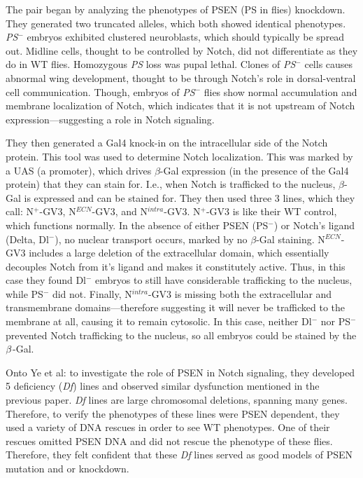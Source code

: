 The pair began by analyzing the phenotypes of PSEN (PS in flies) knockdown. They generated two truncated alleles, which both showed identical phenotypes. \textit{PS}$^-$ embryos exhibited clustered neuroblasts, which should typically be spread out. Midline cells, thought to be controlled by Notch, did not differentiate as they do in WT flies. Homozygous \textit{PS} loss was pupal lethal. Clones of \textit{PS}$^-$ cells causes abnormal wing development, thought to be through Notch's role in dorsal-ventral cell communication. Though, embryos of \textit{PS}$^-$ flies show normal accumulation and membrane localization of Notch, which indicates that it is not upstream of Notch expression---suggesting a role in Notch signaling.\newline

They then generated a Gal4 knock-in on the intracellular side of the Notch protein. This tool was used to determine Notch localization. This was marked by a UAS (a promoter), which drives $\beta$-Gal expression (in the presence of the Gal4 protein) that they can stain for. I.e., when Notch is trafficked to the nucleus, $\beta$-Gal is expressed and can be stained for. They then used three 3 lines, which they call: N$^+$-GV3, N$^{ECN}$-GV3, and N$^{intra}$-GV3. N$^+$-GV3 is like their WT control, which functions normally. In the absence of either PSEN (PS$^-$) or Notch's ligand (Delta, Dl$^-$), no nuclear transport occurs, marked by no $\beta$-Gal staining. N$^{ECN}$-GV3 includes a large deletion of the extracellular domain, which essentially decouples Notch from it's ligand and makes it constitutely active. Thus, in this case they found Dl$^-$ embryos to still have considerable trafficking to the nucleus, while PS$^-$ did not. Finally, N$^{intra}$-GV3 is missing both the extracellular and transmembrane domains---therefore suggesting it will never be trafficked to the membrane at all, causing it to remain cytosolic. In this case, neither Dl$^-$ nor PS$^-$ prevented Notch trafficking to the nucleus, so all embryos could be stained by the $\beta$-Gal.\newline

Onto Ye et al: to investigate the role of PSEN in Notch signaling, they developed 5 deficiency (\textit{Df}) lines and observed similar dysfunction mentioned in the previous paper. \textit{Df} lines are large chromosomal deletions, spanning many genes. Therefore, to verify the phenotypes of these lines were PSEN dependent, they used a variety of DNA rescues in order to see WT phenotypes. One of their rescues omitted PSEN DNA and did not rescue the phenotype of these flies. Therefore, they felt confident that these \textit{Df} lines served as good models of PSEN mutation and or knockdown.\newline

